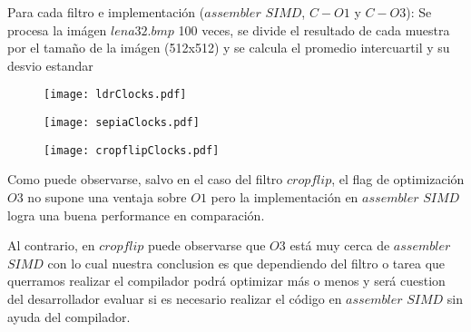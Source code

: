Para cada filtro e implementación ($assembler$ $SIMD$, $C-O1$ y $C-O3$): Se procesa la imágen $lena32.bmp$ 100 veces, se divide el resultado de cada muestra por el tamaño de la imágen (512x512) y se calcula el promedio intercuartil y su desvio estandar

\begin{figure}[h]
  \begin{center}
	\texttt{[image: ldrClocks.pdf]}
  \end{center}
\end{figure}

\begin{figure}[h]
  \begin{center}
	\texttt{[image: sepiaClocks.pdf]}
  \end{center}
\end{figure}

\newpage

\begin{figure}
  \begin{center}
	\texttt{[image: cropflipClocks.pdf]}
  \end{center}
\end{figure}

Como puede observarse, salvo en el caso del filtro $cropflip$, el flag de optimización $O3$ no supone una ventaja sobre $O1$ pero la implementación en $assembler$ $SIMD$ logra una buena performance en comparación. 

Al contrario, en $cropflip$ puede observarse que $O3$ está muy cerca de $assembler$ $SIMD$ con lo cual nuestra conclusion es que dependiendo del filtro o tarea que querramos realizar el compilador podrá optimizar más o menos y será cuestion del desarrollador evaluar si es necesario realizar el código en $assembler$ $SIMD$ sin ayuda del compilador.
